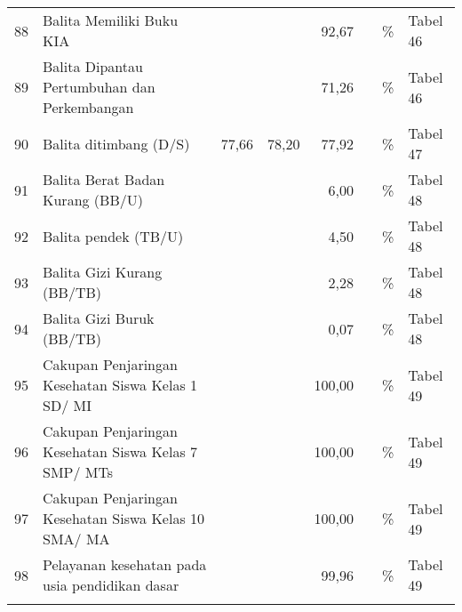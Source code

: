 \begin{small}
\begin{longtable}{rY{12em}rrrrY{5em}Y{5em}}
	 88 & Balita Memiliki Buku KIA                                                    &        &        &              92,67 &          & \%                             & Tabel 46 \\
	 89 & Balita Dipantau Pertumbuhan dan Perkembangan                                &        &        &              71,26 &          & \%                             & Tabel 46 \\
	 90 & Balita ditimbang (D/S)                                                      &  77,66 &  78,20 &              77,92 &          & \%                             & Tabel 47 \\
	 91 & Balita Berat Badan Kurang (BB/U)                                            &        &        &               6,00 &          & \%                             & Tabel 48 \\
	 92 & Balita pendek (TB/U)                                                        &        &        &               4,50 &          & \%                             & Tabel 48 \\
	 93 & Balita Gizi Kurang (BB/TB)                                                  &        &        &               2,28 &          & \%                             & Tabel 48 \\
	 94 & Balita Gizi Buruk (BB/TB)                                                   &        &        &               0,07 &          & \%                             & Tabel 48 \\
	 95 & Cakupan Penjaringan Kesehatan Siswa Kelas 1 SD/ MI                          &        &        &             100,00 &          & \%                             & Tabel 49 \\
	 96 & Cakupan Penjaringan Kesehatan Siswa Kelas 7 SMP/ MTs                        &        &        &             100,00 &          & \%                             & Tabel 49 \\
	 97 & Cakupan Penjaringan Kesehatan Siswa Kelas 10 SMA/ MA                        &        &        &             100,00 &          & \%                             & Tabel 49 \\
	 98 & Pelayanan kesehatan pada usia pendidikan dasar                              &        &        &              99,96 &          & \%                             & Tabel 49 \\
	 &                                                                                &        &        &                    &          &                                &          \\

\end{longtable}
\end{small}
